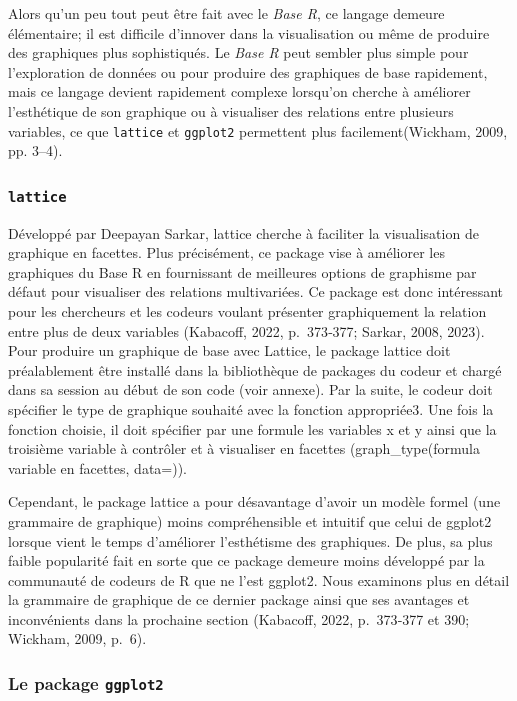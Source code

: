 \documentclass[
  letterpaper,
  DIV=11,
  numbers=noendperiod]{scrreprt}
\begin{document}
Alors qu'un peu tout peut être fait avec le \emph{Base R}, ce langage
demeure élémentaire; il est difficile d'innover dans la visualisation ou
même de produire des graphiques plus sophistiqués. Le \emph{Base R} peut
sembler plus simple pour l'exploration de données ou pour produire des
graphiques de base rapidement, mais ce langage devient rapidement
complexe lorsqu'on cherche à améliorer l'esthétique de son graphique ou
à visualiser des relations entre plusieurs variables, ce que
\texttt{lattice} et \texttt{ggplot2} permettent plus facilement(Wickham,
2009, pp. 3--4).

\subsubsection{\texorpdfstring{\texttt{lattice}}{lattice}}\label{lattice}

Développé par Deepayan Sarkar, lattice cherche à faciliter la
visualisation de graphique en facettes. Plus précisément, ce package
vise à améliorer les graphiques du Base R en fournissant de meilleures
options de graphisme par défaut pour visualiser des relations
multivariées. Ce package est donc intéressant pour les chercheurs et les
codeurs voulant présenter graphiquement la relation entre plus de deux
variables (Kabacoff, 2022, p.~373‑377; Sarkar, 2008, 2023). Pour
produire un graphique de base avec Lattice, le package lattice doit
préalablement être installé dans la bibliothèque de packages du codeur
et chargé dans sa session au début de son code (voir annexe). Par la
suite, le codeur doit spécifier le type de graphique souhaité avec la
fonction appropriée3. Une fois la fonction choisie, il doit spécifier
par une formule les variables x et y ainsi que la troisième variable à
contrôler et à visualiser en facettes (graph\_type(formula \textbar{}
variable en facettes, data=)).

Cependant, le package lattice a pour désavantage d'avoir un modèle
formel (une grammaire de graphique) moins compréhensible et intuitif que
celui de ggplot2 lorsque vient le temps d'améliorer l'esthétisme des
graphiques. De plus, sa plus faible popularité fait en sorte que ce
package demeure moins développé par la communauté de codeurs de R que ne
l'est ggplot2. Nous examinons plus en détail la grammaire de graphique
de ce dernier package ainsi que ses avantages et inconvénients dans la
prochaine section (Kabacoff, 2022, p.~373‑377 et 390; Wickham, 2009,
p.~6).

\subsubsection{\texorpdfstring{Le package
\texttt{ggplot2}}{Le package ggplot2}}\label{le-package-ggplot2}
\end{document}
